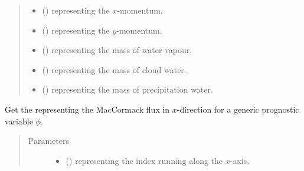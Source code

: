 \documentclass[letterpaper,10pt,english]{sphinxmanual}
\begin{document}
\begin{fulllineitems}
\begin{fulllineitems}
\begin{quote}
\begin{description}
\begin{itemize}
\item {} 
 () \textendash{}  representing the \(x\)-momentum.

\item {} 
 () \textendash{}  representing the \(y\)-momentum.

\item {} 
 () \textendash{}  representing the mass of water vapour.

\item {} 
 () \textendash{}  representing the mass of cloud water.

\item {} 
 () \textendash{}  representing the mass of precipitation water.

\end{itemize}

\end{description}\end{quote}

\end{fulllineitems}


\begin{fulllineitems}
\label{\detokenize{api:dycore.flux_isentropic.FluxIsentropicMacCormack._get_maccormack_flux_x}}
Get the  representing the MacCormack flux in \(x\)-direction for a
generic prognostic variable \(\phi\).
\begin{quote}\begin{description}
\item[{Parameters}] \leavevmode\begin{itemize}
\item {} 
 () \textendash{}  representing the index running along the \(x\)-axis.


\end{itemize}
\end{description}
\end{quote}
\end{fulllineitems}
\end{fulllineitems}
\end{document}
